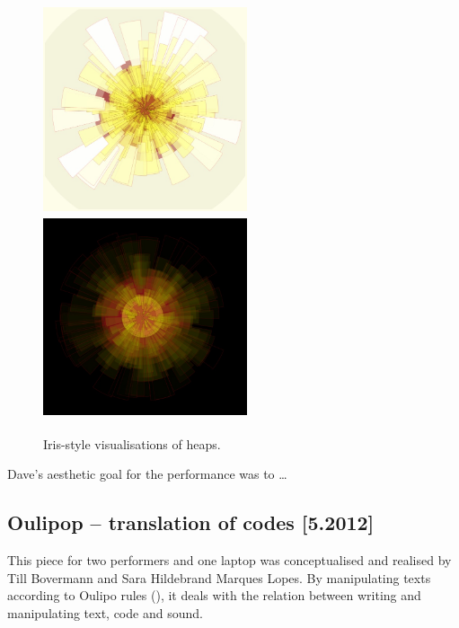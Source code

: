 \documentclass[letterpaper, 12pt]{article}
\begin{document}
\begin{figure}
	\centering
		\includegraphics[width=6cm, height=6cm]{2013-heapIris-white}
		\includegraphics[width=6cm, height=6cm]{2013-heapIris-black}
	\caption{Iris-style visualisations of heaps.}
	\label{fig:fig_2013-heapIris-white}
\end{figure}

Dave's aesthetic goal for the performance was to \dots


\subsection{Oulipop -- translation of codes [5.2012]}
\label{sub:oulipop}

This piece for two performers and one laptop was conceptualised and realised by Till Bovermann and Sara Hildebrand Marques Lopes.
By manipulating texts according to Oulipo rules (\cite{mathews2005-oul}), it deals with the relation between writing and manipulating text, code and sound.
\end{document}
